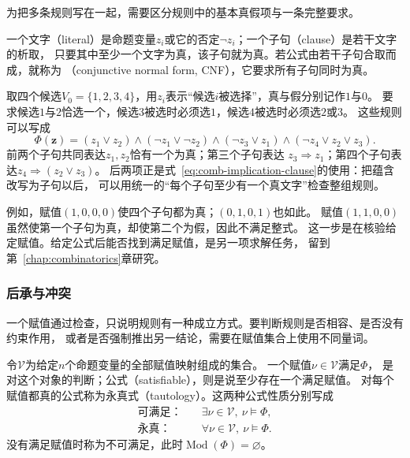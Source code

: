 为把多条规则写在一起，需要区分规则中的基本真假项与一条完整要求。
\begin{definition}[文字、子句与合取范式]
\label{def:comb-literals-cnf}
一个文字（literal）是命题变量$z_i$或它的否定$\neg z_i$；一个子句（clause）是若干文字的析取，
只要其中至少一个文字为真，该子句就为真。若公式由若干子句合取而成，就称为
（conjunctive normal form, CNF），它要求所有子句同时为真。
\end{definition}

取四个候选$V_0=\{1,2,3,4\}$，用$z_i$表示“候选$i$被选择”，真与假分别记作$1$与$0$。
要求候选$1$与$2$恰选一个，候选$3$被选时必须选$1$，候选$4$被选时必须选$2$或$3$。
这些规则可以写成
\begin{equation}
  \Phi(\bm{z})
  =
  (z_1\lor z_2)
  \land(\neg z_1\lor\neg z_2)
  \land(\neg z_3\lor z_1)
  \land(\neg z_4\lor z_2\lor z_3).
  \label{eq:comb-running-cnf}
\end{equation}
前两个子句共同表达$z_1,z_2$恰有一个为真；第三个子句表达
$z_3\Rightarrow z_1$；第四个子句表达$z_4\Rightarrow(z_2\lor z_3)$。
后两项正是式~\eqref{eq:comb-implication-clause}的使用：把蕴含改写为子句以后，
可以用统一的“每个子句至少有一个真文字”检查整组规则。

例如，赋值$(1,0,0,0)$使四个子句都为真；$(0,1,0,1)$也如此。
赋值$(1,1,0,0)$虽然使第一个子句为真，却使第二个为假，因此不满足整式。
这一步是在核验给定赋值。给定公式后能否找到满足赋值，是另一项求解任务，
留到第~\ref{chap:combinatorics}章研究。

\subsubsection{后承与冲突}
\label{sec:prelim-entailment-conflicts}

一个赋值通过检查，只说明规则有一种成立方式。要判断规则是否相容、是否没有约束作用，
或者是否强制推出另一结论，需要在赋值集合上使用不同量词。

\begin{definition}[满足、可满足与永真]
\label{def:comb-satisfiability}
令$\mathcal{V}$为给定$n$个命题变量的全部赋值映射组成的集合。
一个赋值$\nu\in\mathcal{V}$满足$\Phi$，
是对这个对象的判断；公式（satisfiable），则是说至少存在一个满足赋值。
对每个赋值都真的公式称为永真式（tautology）。这两种公式性质分别写成
\[
  \begin{aligned}
    \text{可满足：}&\quad \exists\nu\in\mathcal{V},\ \nu\models\Phi,\\
    \text{永真：}&\quad \forall\nu\in\mathcal{V},\ \nu\models\Phi.
  \end{aligned}
\]
没有满足赋值时称为不可满足，此时$\operatorname{Mod}(\Phi)=\varnothing$。
\end{definition}

